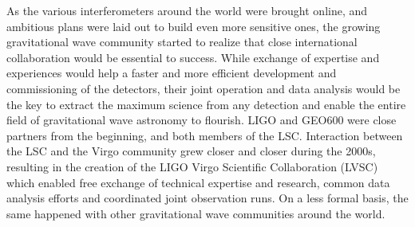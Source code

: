 As the various interferometers around the world were brought online, and ambitious plans were laid out to build even more sensitive ones, the growing gravitational wave community started to realize that close international collaboration would be essential to success.
While exchange of expertise and experiences would help a faster and more efficient development and commissioning of the detectors, their joint operation and data analysis would be the key to extract the maximum science from any detection and enable the entire field of gravitational wave astronomy to flourish.
LIGO and GEO600 were close partners from the beginning, and both members of the LSC. Interaction between the LSC and the Virgo community grew closer and closer during the 2000s, resulting in the creation of the LIGO Virgo Scientific Collaboration (LVSC) which enabled free exchange of technical expertise and research, common data analysis efforts and coordinated joint observation runs.
On a less formal basis, the same happened with other gravitational wave communities around the world.